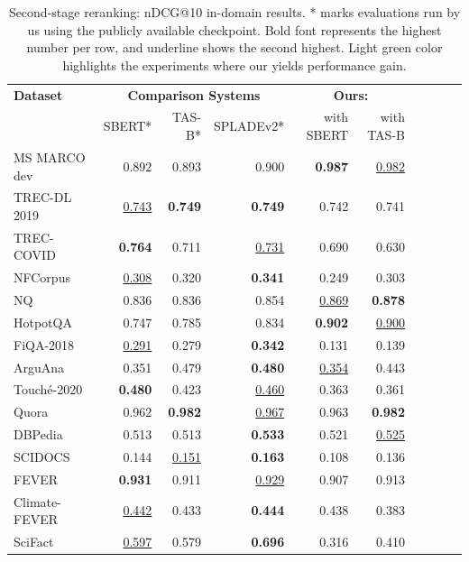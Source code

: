 \begin{table}[tb!] 
    \vspace{-20pt}
    \caption{Second-stage reranking: nDCG@10 in-domain results. * marks evaluations run by us using the publicly available checkpoint. Bold font represents the highest number per row, and underline shows the second highest. Light green color highlights the experiments where our \alg{} yields performance gain.} 
    \vspace{5pt}
    \centering \small
    \begin{tabular}{l r r r r r r r r r }
        \toprule
        \textbf{Dataset} & \multicolumn{3}{c}{\textbf{Comparison Systems}} & \multicolumn{2}{c}{\textbf{Ours: \alg{}}} \\
            & SBERT* & TAS-B* & SPLADEv2* & with SBERT & with TAS-B   \\ 
        \midrule
MS MARCO dev & 0.892 & 0.893 & 0.900 & \cellcolor{lightgreen}\textbf{0.987} & \cellcolor{lightgreen}\underline{0.982} \\
        \midrule
TREC-DL 2019 & \underline{0.743} & \textbf{0.749} & \textbf{0.749} & 0.742 & 0.741\\
TREC-COVID & \textbf{0.764} & 0.711 & \underline{0.731} & 0.690 & 0.630\\
NFCorpus & \underline{0.308} & 0.320 & \textbf{0.341} & 0.249 & 0.303\\
NQ & 0.836 & 0.836 & 0.854 & \cellcolor{lightgreen}\underline{0.869} & \cellcolor{lightgreen}\textbf{0.878}\\
HotpotQA & 0.747 & 0.785 & 0.834 & \cellcolor{lightgreen}\textbf{0.902} & \cellcolor{lightgreen}\underline{0.900}\\
FiQA-2018 & \underline{0.291} & 0.279 & \textbf{0.342} & 0.131 & 0.139\\
ArguAna & 0.351 & 0.479 & \textbf{0.480} & \cellcolor{lightgreen}\underline{0.354} & 0.443\\
Touché-2020 & \textbf{0.480} & 0.423 & \underline{0.460} & 0.363 & 0.361\\
Quora & 0.962 & \textbf{0.982} & \underline{0.967} & \cellcolor{lightgreen}0.963 & \cellcolor{lightgreen}\textbf{0.982}\\
DBPedia & 0.513 & 0.513 & \textbf{0.533} & \cellcolor{lightgreen}0.521 & \cellcolor{lightgreen}\underline{0.525}\\
SCIDOCS & 0.144 & \underline{0.151} & \textbf{0.163} & 0.108 & 0.136\\
FEVER & \textbf{0.931} & 0.911 & \underline{0.929} & 0.907 & \cellcolor{lightgreen}0.913\\
Climate-FEVER & \underline{0.442} & 0.433 & \textbf{0.444} & 0.438 & 0.383\\
SciFact & \underline{0.597} & 0.579 & \textbf{0.696} & 0.316 & 0.410\\
        \bottomrule
    \end{tabular}
    \vspace{-8pt}
\end{table}